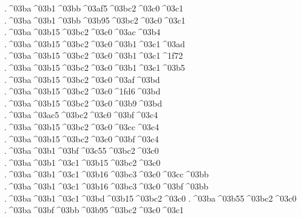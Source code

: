 {.^^^^03ba^^^^03b1^^^^03bb^^^^03af5^^^^03bc2^^^^03c0^^^^03c1  %
.^^^^03ba^^^^03b1^^^^03bb^^^^03b95^^^^03bc2^^^^03c0^^^^03c1  
.^^^^03ba^^^^03b15^^^^03bc2^^^^03c0^^^^03ac^^^^03b4   %
.^^^^03ba^^^^03b15^^^^03bc2^^^^03c0^^^^03b1^^^^03c1^^^^03ad  %
.^^^^03ba^^^^03b15^^^^03bc2^^^^03c0^^^^03b1^^^^03c1^^^^1f72
.^^^^03ba^^^^03b15^^^^03bc2^^^^03c0^^^^03b1^^^^03c1^^^^03b5
.^^^^03ba^^^^03b15^^^^03bc2^^^^03c0^^^^03af^^^^03bd   %
.^^^^03ba^^^^03b15^^^^03bc2^^^^03c0^^^^1fd6^^^^03bd
.^^^^03ba^^^^03b15^^^^03bc2^^^^03c0^^^^03b9^^^^03bd
.^^^^03ba^^^^03ac5^^^^03bc2^^^^03c0^^^^03bf^^^^03c4   %
.^^^^03ba^^^^03b15^^^^03bc2^^^^03c0^^^^03cc^^^^03c4
.^^^^03ba^^^^03b15^^^^03bc2^^^^03c0^^^^03bf^^^^03c4
.^^^^03ba^^^^03b1^^^^03bf^^^^03c55^^^^03bc2^^^^03c0    %
.^^^^03ba^^^^03b1^^^^03c1^^^^03b15^^^^03bc2^^^^03c0    %
  .^^^^03ba^^^^03b1^^^^03c1^^^^03b16^^^^03bc3^^^^03c0^^^^03cc^^^^03bb %
  .^^^^03ba^^^^03b1^^^^03c1^^^^03b16^^^^03bc3^^^^03c0^^^^03bf^^^^03bb
.^^^^03ba^^^^03b1^^^^03c1^^^^03bd^^^^03b15^^^^03bc2^^^^03c0   %
.^^^^03ba^^^^03b55^^^^03bc2^^^^03c0      %
.^^^^03ba^^^^03bf^^^^03bb^^^^03b95^^^^03bc2^^^^03c0^^^^03c1   %
}

